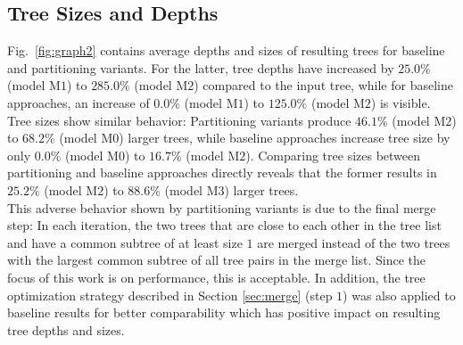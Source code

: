 \subsection{Tree Sizes and Depths}  
Fig.~\ref{fig:graph2} contains average depths and sizes of resulting trees for baseline and partitioning variants.
For the latter, tree depths have increased by $25.0\%$ (model M$1$) to $285.0\%$ (model M$2$) compared to the input tree, while for baseline approaches, an increase of $0.0\%$ (model M$1$) to $125.0\%$ (model M$2$) is visible.
Tree sizes show similar behavior:
Partitioning variants produce $46.1\%$ (model M$2$) to $68.2\%$ (model M$0$) larger trees, while baseline approaches increase tree size by only $0.0\%$ (model M$0$) to $16.7\%$ (model M$2$).
Comparing tree sizes between partitioning and baseline approaches directly reveals that the former results in $25.2\%$ (model M$2$) to $88.6\%$ (model M$3$) larger trees.
\\
This adverse behavior shown by partitioning variants is due to the final merge step:
In each iteration, the two trees that are close to each other in the tree list and have a common subtree of at least size $1$ are merged instead of the two trees with the largest common subtree of all tree pairs in the merge list. 
Since the focus of this work is on performance, this is acceptable.
In addition, the tree optimization strategy described in Section \ref{sec:merge} (step $1$) was also applied to baseline results for better comparability which has positive impact on resulting tree depths and sizes.
